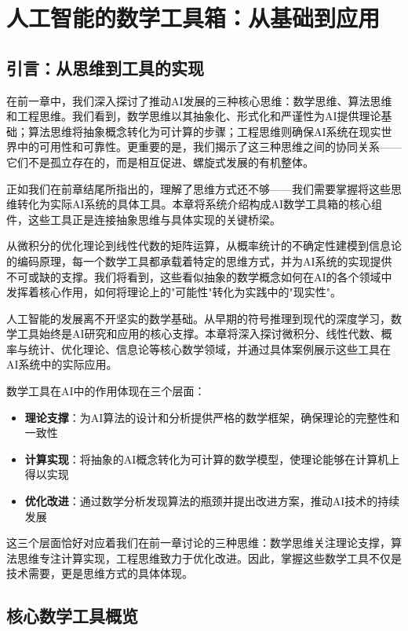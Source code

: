 \chapter{人工智能的数学工具箱：从基础到应用}

\section{引言：从思维到工具的实现}

在前一章中，我们深入探讨了推动AI发展的三种核心思维：数学思维、算法思维和工程思维。我们看到，数学思维以其抽象化、形式化和严谨性为AI提供理论基础；算法思维将抽象概念转化为可计算的步骤；工程思维则确保AI系统在现实世界中的可用性和可靠性。更重要的是，我们揭示了这三种思维之间的协同关系——它们不是孤立存在的，而是相互促进、螺旋式发展的有机整体。

正如我们在前章结尾所指出的，理解了思维方式还不够——我们需要掌握将这些思维转化为实际AI系统的具体工具。本章将系统介绍构成AI数学工具箱的核心组件，这些工具正是连接抽象思维与具体实现的关键桥梁。

从微积分的优化理论到线性代数的矩阵运算，从概率统计的不确定性建模到信息论的编码原理，每一个数学工具都承载着特定的思维方式，并为AI系统的实现提供不可或缺的支撑。我们将看到，这些看似抽象的数学概念如何在AI的各个领域中发挥着核心作用，如何将理论上的"可能性"转化为实践中的"现实性"。

人工智能的发展离不开坚实的数学基础。从早期的符号推理到现代的深度学习，数学工具始终是AI研究和应用的核心支撑。本章将深入探讨微积分、线性代数、概率与统计、优化理论、信息论等核心数学领域，并通过具体案例展示这些工具在AI系统中的实际应用。

数学工具在AI中的作用体现在三个层面：
\begin{itemize}
\item \textbf{理论支撑}：为AI算法的设计和分析提供严格的数学框架，确保理论的完整性和一致性
\item \textbf{计算实现}：将抽象的AI概念转化为可计算的数学模型，使理论能够在计算机上得以实现
\item \textbf{优化改进}：通过数学分析发现算法的瓶颈并提出改进方案，推动AI技术的持续发展
\end{itemize}

这三个层面恰好对应着我们在前一章讨论的三种思维：数学思维关注理论支撑，算法思维专注计算实现，工程思维致力于优化改进。因此，掌握这些数学工具不仅是技术需要，更是思维方式的具体体现。

\section{核心数学工具概览}

